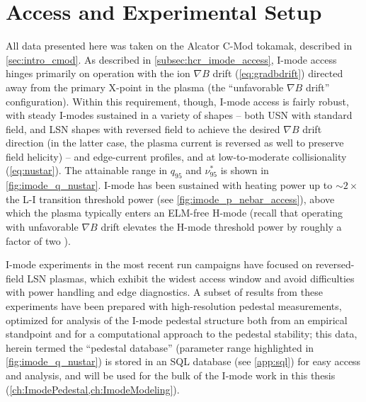 \section{Access and Experimental Setup}\label{sec:imode_setup}

All data presented here was taken on the Alcator C-Mod tokamak, described in \cref{sec:intro_cmod}.  As described in \cref{subsec:hcr_imode_access}, I-mode access hinges primarily on operation with the ion $\nabla B$ drift (\cref{eq:gradbdrift}) directed away from the primary X-point in the plasma (the ``unfavorable $\nabla B$ drift'' configuration).  Within this requirement, though, I-mode access is fairly robust, with steady I-modes sustained in a variety of shapes -- both USN with standard field, and LSN shapes with reversed field to achieve the desired $\nabla B$ drift direction (in the latter case, the plasma current is reversed as well to preserve field helicity) -- and edge-current profiles, and at low-to-moderate collisionality (\cref{eq:nustar}).  The attainable range in $q_{95}$ and $\nu^*_{95}$ is shown in \cref{fig:imode_q_nustar}.  I-mode has been sustained with heating power up to $\sim 2 \times$ the L-I transition threshold power (see \cref{fig:imode_p_nebar_access}), above which the plasma typically enters an ELM-free H-mode (recall that operating with unfavorable $\nabla B$ drift elevates the H-mode threshold power by roughly a factor of two \cite{Suttrop2003,Carlstrom1998,Groebner1998}).

I-mode experiments in the most recent run campaigns have focused on reversed-field LSN plasmas, which exhibit the widest access window and avoid difficulties with power handling and edge diagnostics.  A subset of results from these experiments have been prepared with high-resolution pedestal measurements, optimized for analysis of the I-mode pedestal structure both from an empirical standpoint and for a computational approach to the pedestal stability; this data, herein termed the ``pedestal database'' (parameter range highlighted in \cref{fig:imode_q_nustar}) is stored in an SQL database (see \cref{app:sql}) for easy access and analysis, and will be used for the bulk of the I-mode work in this thesis (\cref{ch:ImodePedestal,ch:ImodeModeling}).

